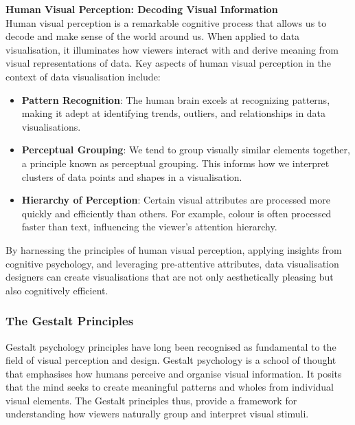 \documentclass{article}\usepackage[]{graphicx}\usepackage[]{xcolor}
\begin{document}
\textbf{Human Visual Perception: Decoding Visual Information}\\
Human visual perception is a remarkable cognitive process that allows us to decode and make sense of the world around us. When applied to data visualisation, it illuminates how viewers interact with and derive meaning from visual representations of data. Key aspects of human visual perception in the context of data visualisation include:
\begin{itemize}
    \item \textbf{Pattern Recognition}: The human brain excels at recognizing patterns, making it adept at identifying trends, outliers, and relationships in data visualisations.
    \item \textbf{Perceptual Grouping}: We tend to group visually similar elements together, a principle known as perceptual grouping. This informs how we interpret clusters of data points and shapes in a visualisation.
    \item \textbf{Hierarchy of Perception}: Certain visual attributes are processed more quickly and efficiently than others. For example, colour is often processed faster than text, influencing the viewer's attention hierarchy.
\end{itemize}

By harnessing the principles of human visual perception, applying insights from cognitive psychology, and leveraging pre-attentive attributes, data visualisation designers can create visualisations that are not only aesthetically pleasing but also cognitively efficient.	

\subsubsection{The Gestalt Principles}
Gestalt psychology principles have long been recognised as fundamental to the field of visual perception and design. Gestalt psychology is a school of thought that emphasises how humans perceive and organise visual information. It posits that the mind seeks to create meaningful patterns and wholes from individual visual elements. The Gestalt principles thus, provide a framework for understanding how viewers naturally group and interpret visual stimuli.\\
\end{document}
